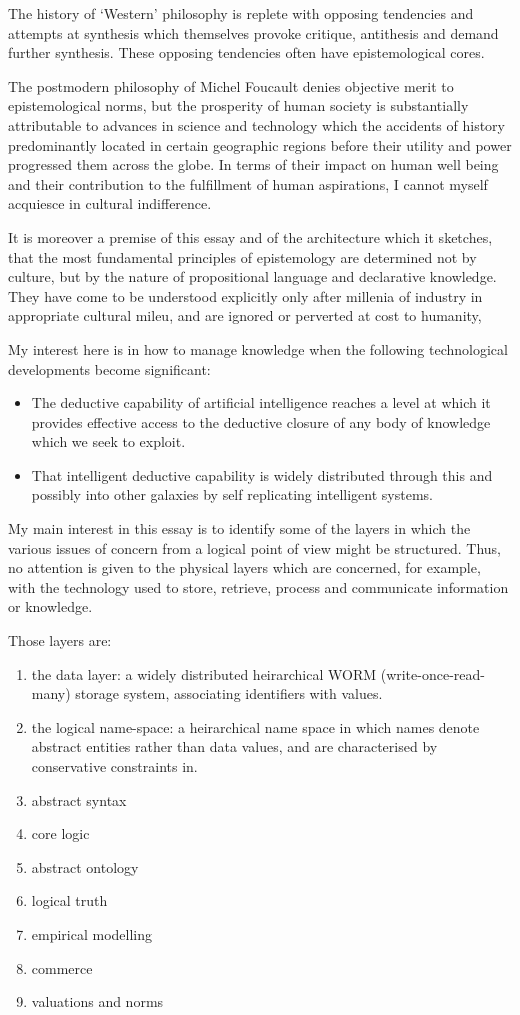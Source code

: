 \documentclass[10pt,titlepage]{article}
\begin{document}
The history of `Western' philosophy is replete with opposing tendencies and attempts at synthesis which themselves provoke critique, antithesis and demand further synthesis.
These opposing tendencies often have epistemological cores.

The postmodern philosophy of Michel Foucault denies objective merit to epistemological norms, but the prosperity of human society is substantially attributable to advances in science and technology which the accidents of history predominantly located in certain geographic regions before their utility and power progressed them across the globe.
In terms of their impact on human well being and their contribution to the fulfillment of human aspirations, I cannot myself acquiesce in cultural indifference.

It is moreover a premise of this essay and of the architecture which it sketches, that the most fundamental principles of epistemology are determined not by culture, but by the nature of propositional language and declarative knowledge.
They have come to be understood explicitly only after millenia of industry in appropriate cultural mileu, and are ignored or perverted at cost to humanity,

My interest here is in how to manage knowledge when the following technological developments become significant:

\begin{itemize}
\item The deductive capability of artificial intelligence reaches a level at which it provides effective access to the deductive closure of any body of knowledge which we seek to exploit.
\item That intelligent deductive capability is widely distributed through this and possibly into other galaxies by self replicating intelligent systems.
\end{itemize}

My main interest in this essay is to identify some of the layers in which the various issues of concern from a logical point of view might be structured.
Thus, no attention is given to the physical layers which are concerned, for example, with the technology used to store, retrieve, process and communicate information or knowledge.

Those layers are:

\begin{enumerate}
\item the data layer: a widely distributed heirarchical WORM (write-once-read-many) storage system, associating identifiers with values.
\item the logical name-space: a heirarchical name space in which names denote abstract entities rather than data values, and are characterised by conservative constraints in.
\item abstract syntax
\item core logic
\item abstract ontology
\item logical truth
\item empirical modelling
\item commerce
\item valuations and norms
\end{enumerate}
\end{document}
